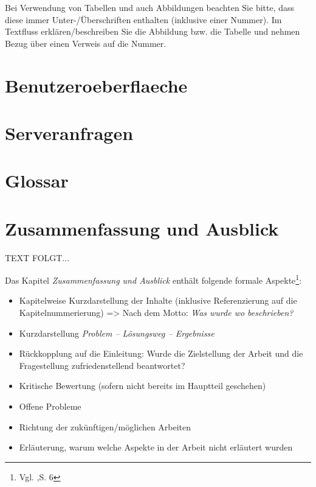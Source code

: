 \documentclass[a4paper,12pt,oneside]{article}
\begin{document}
    \vspace{1cm}
 \begin{tcolorbox}[title={Abbildungen, Tabellen \& Co.}]
Bei Verwendung von Tabellen und auch Abbildungen beachten Sie bitte, dass diese immer Unter-/Überschriften enthalten (inklusive einer Nummer). Im Textfluss erklären/beschreiben Sie die Abbildung bzw. die Tabelle und nehmen Bezug über einen Verweis auf die Nummer.
  \end{tcolorbox}
  
  \newpage
  \section{Benutzeroeberflaeche}\label{kap_benutzeroeberflaeche}
  

  \newpage
  \section{Serveranfragen}\label{kap_serveranfragen }
  

  \newpage
  \section{Glossar}\label{kap_glossar}
  


  \newpage 
  \section{Zusammenfassung und Ausblick}\label{kap_zusammfAusbl}  
   TEXT FOLGT...
   
    \vspace{1cm}
 \begin{tcolorbox}[title={Inhalte der \textit{Zusammenfassung und Ausblick}}]
Das Kapitel \textit{Zusammenfassung und Ausblick} enthält folgende formale Aspekte\footnote{Vgl. \cite{BBoJ},S. 6}:
\begin{itemize}
\item Kapitelweise Kurzdarstellung der Inhalte (inklusive Referenzierung auf die Kapitelnummerierung) => Nach dem Motto: \textit{Was wurde wo beschrieben?}
\item Kurzdarstellung \textit{Problem – Lösungsweg – Ergebnisse}
\item Rückkopplung auf die Einleitung: Wurde die Zielstellung der Arbeit und die Fragestellung zufriedenstellend beantwortet?
\item Kritische Bewertung (sofern nicht bereits im Hauptteil geschehen)
\item Offene Probleme
\item Richtung der zukünftigen/möglichen Arbeiten
\item Erläuterung, warum welche Aspekte in der Arbeit nicht erläutert wurden
\end{itemize}
  \end{tcolorbox}
   
\end{document}
